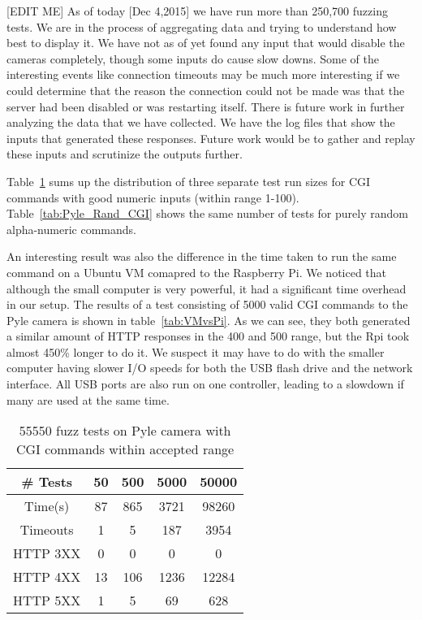 \documentclass[letterpaper,twocolumn,10pt]{article}
\begin{document}
[EDIT ME]
As of today [Dec 4,2015] we have run more than 250,700 fuzzing tests. We are in the process of aggregating data and trying to understand how best to display it. We have not as of yet found any input that would disable the cameras completely, though some inputs do cause slow downs. Some of the interesting events like connection timeouts may be much more interesting if we could determine that the reason the connection could not be made was that the server had been disabled or was restarting itself. There is future work in further analyzing the data that we have collected. We have the log files that show the inputs that generated these responses. Future work would be to gather and replay these inputs and scrutinize the outputs further. 

Table~\ref{tab:Pyle_Good_CGI} sums up the distribution of three separate test run sizes for CGI commands with good numeric inputs (within range 1-100). Table~\ref{tab:Pyle_Rand_CGI} shows the same number of tests for purely random alpha-numeric commands.

An interesting result was also the difference in the time taken to run the same command on a Ubuntu VM comapred to the Raspberry Pi. We noticed that although the small computer is very powerful, it had a significant time overhead in our setup. The results of a test consisting of 5000 valid CGI commands to the Pyle camera is shown in table~\ref{tab:VMvsPi}. As we can see, they both generated a similar amount of HTTP responses in the 400 and 500 range, but the Rpi took almost 450\% longer to do it. We suspect it may have to do with the smaller computer having slower I/O speeds for both the USB flash drive and the network interface. All USB ports are also run on one controller, leading to a slowdown if many are used at the same time.

\begin{table}
\centering
	\begin{tabular}{ |c|c|c|c|c| }
		\hline
		\# Tests & 50 & 500 & 5000 & 50000 \\
		\hline
		\hline
		Time(s) & 87 & 865 & 3721 & 98260\\
		Timeouts & 1 & 5 & 187 & 3954 \\
		HTTP 3XX & 0 & 0 & 0 & 0\\
		HTTP 4XX & 13 & 106 & 1236 & 12284\\
		HTTP 5XX & 1 & 5 & 69 & 628\\
		\hline
	\end{tabular}
	\caption{55550 fuzz tests on Pyle camera with CGI commands within accepted range}
	\label{tab:Pyle_Good_CGI} 
\end{table}
\end{document}
